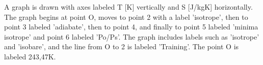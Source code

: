 A graph is drawn with axes labeled T [K] vertically and S [J/kgK] horizontally. The graph begins at point O, moves to point 2 with a label 'isotrope', then to point 3 labeled 'adiabate', then to point 4, and finally to point 5 labeled 'minima isotrope' and point 6 labeled 'Po/Ps'. The graph includes labels such as 'isotrope' and 'isobare', and the line from O to 2 is labeled 'Training'. The point O is labeled 243,47K.